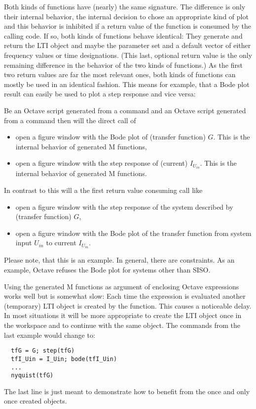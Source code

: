 Both kinds of functions have (nearly) the same signature. The difference
is only their internal behavior, the internal decision to chose an
appropriate kind of plot and this behavior is inhibited if a return value
of the function is consumed by the calling code. If so, both kinds of
functions behave identical: They generate and return the LTI object and
maybe the parameter set and a default vector of either frequency values or
time designations. (This last, optional return value is the only remaining
difference in the behavior of the two kinds of functions.) As the first
two return values are far the most relevant ones, both kinds of functions
can mostly be used in an identical fashion. This means for example, that a
Bode plot result can easily be used to plot a step response and vice
versa:

Be  an Octave script generated from a  command and
 an Octave script generated from a  command then
will the direct call of
\begin{itemize}
  \item {} open a figure window with the Bode plot of (transfer
    function) $G$. This is the internal behavior of  generated
    M functions,
  \item {} open a figure window with the step response of
    (current) $I_{U_{in}}$. This is the internal behavior of 
    generated M functions.
\end{itemize}
In contrast to this will a the first return value consuming call like
\begin{itemize}
  \item {} open a figure window with the step response of the
    system described by (transfer
    function) $G$,
  \item {} open a figure window with the Bode plot of the
    transfer function from system input $U_{in}$ to current $I_{U_{in}}$.
\end{itemize}
Please note, that this is an example. In general, there are constraints.
As an example, Octave refuses the Bode plot for systems other than SISO.

Using the generated M functions as argument of enclosing Octave
expressions works well but is somewhat slow: Each time the
expression is evaluated another (temporary) LTI object is created by the
function. This causes a noticeable delay. In most situations it will be
more appropriate to create the LTI object once in the workspace and to
continue with the same object. The commands from the last example would
change to:
\begin{verbatim}
  tfG = G; step(tfG)
  tfI_Uin = I_Uin; bode(tfI_Uin)
  ...
  nyquist(tfG)
\end{verbatim}
The last line is just meant to demonstrate how to benefit from the once
and only once created objects.


